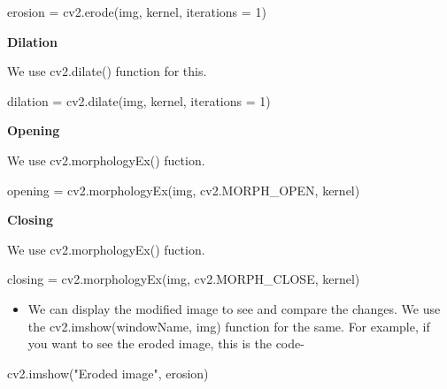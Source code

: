 \documentclass[]{article}
\newenvironment{Shaded}{}{}
\newcommand{\DecValTok}[1]{\textcolor[rgb]{0.25,0.63,0.44}{{#1}}}
\newcommand{\StringTok}[1]{\textcolor[rgb]{0.25,0.44,0.63}{{#1}}}
\newcommand{\OperatorTok}[1]{\textcolor[rgb]{0.40,0.40,0.40}{{#1}}}
\newcommand{\NormalTok}[1]{{#1}}
\providecommand{\tightlist}{%
  \setlength{\itemsep}{0pt}\setlength{\parskip}{0pt}}
\begin{document}
\begin{Shaded}
\begin{Highlighting}[]
    \NormalTok{erosion }\OperatorTok{=} \NormalTok{cv2.erode(img, kernel, iterations }\OperatorTok{=} \DecValTok{1}\NormalTok{)}
\end{Highlighting}
\end{Shaded}

\textbf{Dilation}

We use cv2.dilate() function for this.

\begin{Shaded}
\begin{Highlighting}[]
    \NormalTok{dilation }\OperatorTok{=} \NormalTok{cv2.dilate(img, kernel, iterations }\OperatorTok{=} \DecValTok{1}\NormalTok{)}
\end{Highlighting}
\end{Shaded}

\textbf{Opening}

We use cv2.morphologyEx() fuction.

\begin{Shaded}
\begin{Highlighting}[]
    \NormalTok{opening }\OperatorTok{=} \NormalTok{cv2.morphologyEx(img, cv2.MORPH_OPEN, kernel)}
\end{Highlighting}
\end{Shaded}

\textbf{Closing}

We use cv2.morphologyEx() fuction.

\begin{Shaded}
\begin{Highlighting}[]
    \NormalTok{closing }\OperatorTok{=} \NormalTok{cv2.morphologyEx(img, cv2.MORPH_CLOSE, kernel)}
\end{Highlighting}
\end{Shaded}

\begin{itemize}
\tightlist
\item
  We can display the modified image to see and compare the changes. We
  use the cv2.imshow(windowName, img) function for the same. For
  example, if you want to see the eroded image, this is the code-
\end{itemize}

\begin{Shaded}
\begin{Highlighting}[]
    \NormalTok{cv2.imshow(}\StringTok{"Eroded image"}\NormalTok{, erosion)}
\end{Highlighting}
\end{Shaded}
\end{document}
